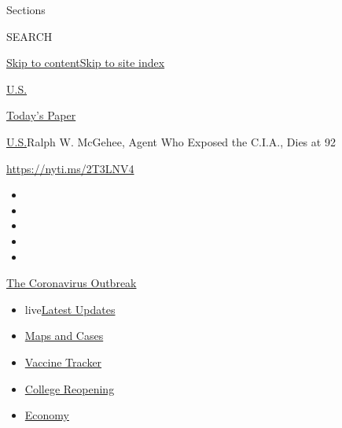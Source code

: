 Sections

SEARCH

\protect\hyperlink{site-content}{Skip to
content}\protect\hyperlink{site-index}{Skip to site index}

\href{https://www.nytimes.com/section/us}{U.S.}

\href{https://myaccount.nytimes.com/auth/login?response_type=cookie\&client_id=vi}{}

\href{https://www.nytimes.com/section/todayspaper}{Today's Paper}

\href{/section/us}{U.S.}\textbar{}Ralph W. McGehee, Agent Who Exposed
the C.I.A., Dies at 92

\url{https://nyti.ms/2T3LNV4}

\begin{itemize}
\item
\item
\item
\item
\item
\end{itemize}

\href{https://www.nytimes.com/news-event/coronavirus?action=click\&pgtype=Article\&state=default\&region=TOP_BANNER\&context=storylines_menu}{The
Coronavirus Outbreak}

\begin{itemize}
\tightlist
\item
  live\href{https://www.nytimes.com/2020/08/03/world/coronavirus-covid-19.html?action=click\&pgtype=Article\&state=default\&region=TOP_BANNER\&context=storylines_menu}{Latest
  Updates}
\item
  \href{https://www.nytimes.com/interactive/2020/us/coronavirus-us-cases.html?action=click\&pgtype=Article\&state=default\&region=TOP_BANNER\&context=storylines_menu}{Maps
  and Cases}
\item
  \href{https://www.nytimes.com/interactive/2020/science/coronavirus-vaccine-tracker.html?action=click\&pgtype=Article\&state=default\&region=TOP_BANNER\&context=storylines_menu}{Vaccine
  Tracker}
\item
  \href{https://www.nytimes.com/2020/08/02/us/covid-college-reopening.html?action=click\&pgtype=Article\&state=default\&region=TOP_BANNER\&context=storylines_menu}{College
  Reopening}
\item
  \href{https://www.nytimes.com/live/2020/08/03/business/stock-market-today-coronavirus?action=click\&pgtype=Article\&state=default\&region=TOP_BANNER\&context=storylines_menu}{Economy}
\end{itemize}

